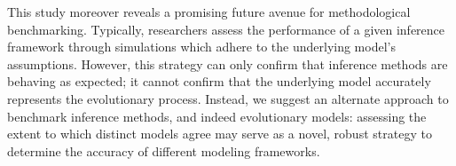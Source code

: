 \documentclass[11pt]{article}
\begin{document}






This study moreover reveals a promising future avenue for methodological benchmarking. Typically, researchers assess the performance of a given inference framework through simulations which adhere to the underlying model's assumptions. However, this strategy can only confirm that inference methods are behaving as expected; it cannot confirm that the underlying model accurately represents the evolutionary process. Instead, we suggest an alternate approach to benchmark inference methods, and indeed evolutionary models: assessing the extent to which distinct models agree may serve as a novel, robust strategy to determine the accuracy of different modeling frameworks.




\clearpage
\newpage

	

\clearpage
\newpage
\end{document}
